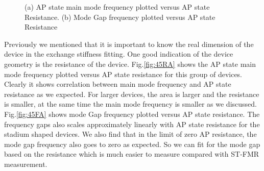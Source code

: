 \begin{figure}[!ht]
\centering
{}
\caption{(a) AP state main mode frequency plotted versus AP state Resistance. (b) Mode Gap frequency plotted versus AP state Resistance }
\end{figure}

Previously we mentioned that it is important to know the real dimension of the device in the exchange stiffness fitting. One good indication of the device geometry is the resistance of the device. Fig.\ref{fig:45RA} shows the AP state main mode frequency plotted versus AP state resistance for this group of devices. Clearly it shows correlation between main mode frequency and AP state resistance as we expected. For larger devices, the area is larger and the resistance is smaller, at the same time the main mode frequency is smaller as we discussed. Fig.\ref{fig:45FA} shows mode Gap frequency plotted versus AP state resistance. The frequency gaps also scales approximately linearly with AP state resistance for the stadium shaped devices. We also find that in the limit of zero AP resistance, the mode gap frequency also goes to zero as expected. So we can fit for the mode gap based on the resistance which is much easier to measure compared with ST-FMR measurement.

